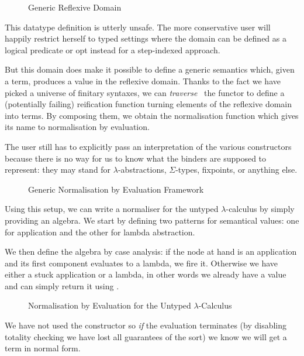 \begin{figure}[h]
\caption{Generic Reflexive Domain}
\end{figure}

This datatype definition is utterly unsafe. The more conservative
user will happily restrict herself to typed settings where the
domain can be defined as a logical predicate or opt instead for
a step-indexed approach.

But this domain does make it possible to define a generic 
semantics which, given a term, produces a value in the reflexive
domain. Thanks to the fact we have picked a universe of finitary syntaxes, we
can \emph{traverse}~\cite{mcbride_paterson_2008} the functor to define
a (potentially failing) reification function turning elements of the
reflexive domain into terms. By composing them, we obtain the
normalisation function which gives its name to normalisation by
evaluation.

The user still has to explicitly pass an interpretation of
the various constructors because there is no way for us to
know what the binders are supposed to represent: they may
stand for $\lambda$-abstractions, $\Sigma$-types, fixpoints, or
anything else.


\begin{figure}[h]
\caption{Generic Normalisation by Evaluation Framework}
\end{figure}

Using this setup, we can write a normaliser for the untyped $\lambda$-calculus
by simply providing an algebra. We start by defining two patterns for
semantical values: one for application and the other for lambda abstraction.


We then define the algebra by case analysis: if the node at hand is an
application and its first component evaluates to a lambda, we fire it.
Otherwise we have either a stuck application or a lambda, in other words
we already have a value and can simply return it using .

\begin{figure}[h]
\caption{Normalisation by Evaluation for the Untyped $\lambda$-Calculus}
\end{figure}

We have not used the  constructor so \emph{if} the evaluation terminates
(by disabling totality checking we have lost all guarantees of the sort) we know
we will get a term in normal form.

